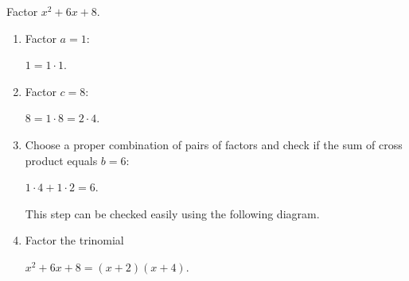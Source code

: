 


	\begin{multicols}{2}
		\begin{example}
			Factor $x^2+6x+8$.
		\end{example}

		\begin{solution}\mbox{}
			\begin{enumerate}[label={\textbf{\textup{Step \arabic*.}}~}]
				\item Factor $a=1$:\\  \centerline{$1=1\cdot 1$.}
				\item Factor $c=8$:\\  \centerline{$8=1\cdot 8=2\cdot 4$.}
				\item Choose a proper combination of pairs of factors and check if the sum of cross product equals $b=6$:\\
				      \centerline{$1\cdot 4+ 1\cdot 2=6$.}
				      This step can be checked easily using the following diagram.\\
				      \begin{minipage}{0.45\textwidth}
					      \begin{center}
					      \end{center}
				      \end{minipage}
				\item Factor the trinomial\\
				      \centerline{$x^2+6x+8=(x+2)(x+4)$.}
			\end{enumerate}
		\end{solution}


\end{multicols}
